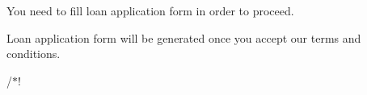 
\begin{DoxyItemize}
\item You need to fill loan application form in order to proceed.
\item Loan application form will be generated once you accept our terms and conditions.
\end{DoxyItemize}

/$\ast$! 